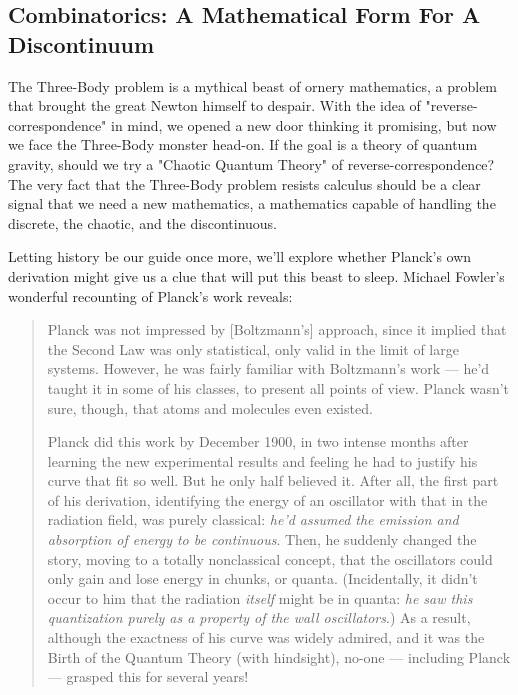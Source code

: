 \documentclass{report}
\begin{document}
\subsection*{Combinatorics: A Mathematical Form For A Discontinuum}
The Three-Body problem is a mythical beast of ornery mathematics, a problem that brought the great Newton himself to despair. With the idea of "reverse-correspondence" in mind, we opened a new door thinking it promising, but now we face the Three-Body monster head-on. If the goal is a theory of quantum gravity, should we try a "Chaotic Quantum Theory" of reverse-correspondence? The very fact that the Three-Body problem resists calculus should be a clear signal that we need a new mathematics, a mathematics capable of handling the discrete, the chaotic, and the discontinuous.

Letting history be our guide once more, we'll explore whether Planck's own derivation might give us a clue that will put this beast to sleep. Michael Fowler's wonderful recounting of Planck's work reveals: \cite{Fowler2008}

\begin{quotation}
    Planck was not impressed by [Boltzmann's] approach, since it implied that the Second Law was only statistical, only valid in the limit of large systems. However, he was fairly familiar with Boltzmann’s work — he’d taught it in some of his classes, to present all points of view. Planck wasn’t sure, though, that atoms and molecules even existed.

    Planck did this work by December 1900, in two intense months after learning the new experimental results and feeling he had to justify his curve that fit so well. But he only half believed it. After all, the first part of his derivation, identifying the energy of an oscillator with that in the radiation field, was purely classical: \textit{he’d assumed the emission and absorption of energy to be continuous}. Then, he suddenly changed the story, moving to a totally nonclassical concept, that the oscillators could only gain and lose energy in chunks, or quanta. (Incidentally, it didn’t occur to him that the radiation \textit{itself} might be in quanta: \textit{he saw this quantization purely as a property of the wall oscillators}.) As a result, although the exactness of his curve was widely admired, and it was the Birth of the Quantum Theory (with hindsight), no-one — including Planck — grasped this for several years!
\end{quotation}
\end{document}

